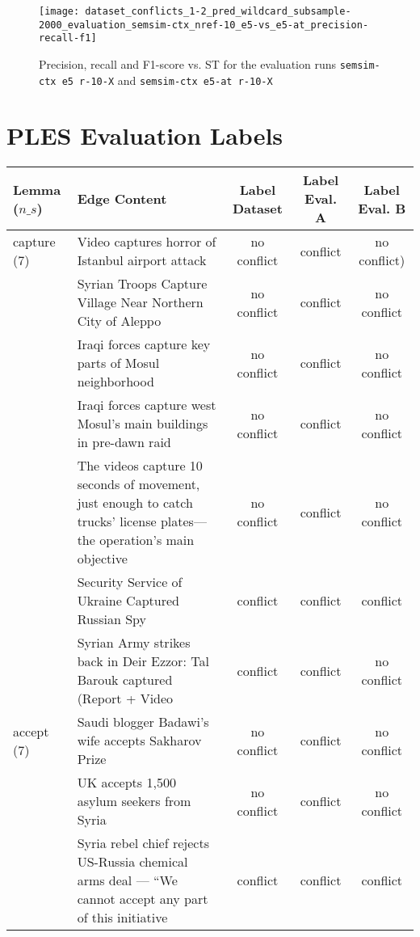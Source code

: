 \begin{figure}[H]
\centering
\texttt{[image: dataset\_conflicts\_1-2\_pred\_wildcard\_subsample-2000\_evaluation\_semsim-ctx\_nref-10\_e5-vs\_e5-at\_precision-recall-f1]}
\caption{Precision, recall and F1-score vs. ST for the evaluation runs \texttt{semsim-ctx e5 r-10-X} and \texttt{semsim-ctx e5-at r-10-X}}
\label{fig:prec-rec-f1-semsim-ctx-at}
\end{figure}



\newpage
\section{PLES Evaluation Labels}
\label{app-sec:ples-eval-labels}

\begin{sidewaystable}[htp]
\centering
\begin{tabular}{l p{13cm} ccc}
\toprule
Lemma (\(n\_s\)) & Edge Content & Label Dataset & Label Eval. A & Label Eval. B \\
\midrule
capture (7) & Video captures horror of Istanbul airport attack & no conflict & conflict & no conflict) \\
& Syrian Troops Capture Village Near Northern City of Aleppo & no conflict & conflict & no conflict \\
& Iraqi forces capture key parts of Mosul neighborhood & no conflict & conflict & no conflict \\
& Iraqi forces capture west Mosul's main buildings in pre-dawn raid & no conflict & conflict & no conflict \\
& The videos capture 10 seconds of movement, just enough to catch trucks’ license plates—the operation’s main objective & no conflict & conflict & no conflict \\
& Security Service of Ukraine Captured Russian Spy & conflict & conflict & conflict \\
& Syrian Army strikes back in Deir Ezzor: Tal Barouk captured (Report + Video & conflict & conflict & no conflict \\
\hline
accept (7)
& Saudi blogger Badawi's wife accepts Sakharov Prize & no conflict & conflict & no conflict \\
& UK accepts 1,500 asylum seekers from Syria & no conflict & conflict & no conflict \\
& Syria rebel chief rejects US-Russia chemical arms deal — “We cannot accept any part of this initiative & conflict & conflict & conflict \\

\end{tabular}
\end{sidewaystable}
